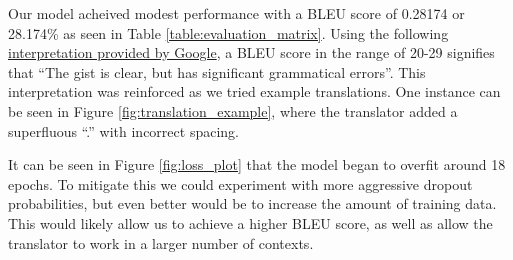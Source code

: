 \documentclass{article}
\begin{document}
Our model acheived modest performance with a BLEU score of 0.28174 or
28.174\% as seen in Table \ref{table:evaluation_matrix}. Using the following
\href{https://cloud.google.com/translate/automl/docs/evaluate#interpretation}{interpretation provided by Google},
a BLEU score in the range of 20-29 signifies that ``The gist is clear, but has
significant grammatical errors''. This interpretation was reinforced as we
tried example translations. One instance can be seen in Figure \ref{fig:translation_example},
where the translator added a superfluous ``.'' with incorrect spacing.

It can be seen in Figure \ref{fig:loss_plot} that the model began to overfit
around 18 epochs. To mitigate this we could experiment with more aggressive
dropout probabilities, but even better would be to increase the amount of
training data. This would likely allow us to achieve a higher BLEU score, as
well as allow the translator to work in a larger number of contexts.
\end{document}
